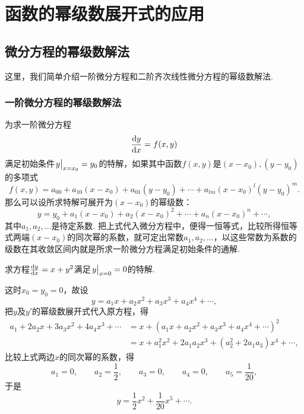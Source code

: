 \section{函数的幂级数展开式的应用}
\subsection{微分方程的幂级数解法}
这里，我们简单介绍一阶微分方程和二阶齐次线性微分方程的幂级数解法.

\subsubsection{一阶微分方程的幂级数解法}
为求一阶微分方程\begin{equation*}
\dv{y}{x} = f(x,y)
\end{equation*}满足初始条件\(\eval{y}_{x=x_0} = y_0\)的特解，如果其中函数\(f(x,y)\)是\((x-x_0),(y-y_0)\)的多项式\begin{equation*}
f(x,y) = a_{00} + a_{10} (x-x_0) + a_{01} (y-y_0) + \dotsb + a_{lm} (x-x_0)^l (y-y_0)^m.
\end{equation*}那么可以设所求特解可展开为\((x-x_0)\)的幂级数：\begin{equation*}
y = y_0 + a_1 (x-x_0) + a_2 (x-x_0)^2 + \dotsb + a_n (x-x_0)^n + \dotsb,
\end{equation*}其中\(a_1,a_2,\dotsc\)是待定系数.
把上式代入微分方程中，便得一恒等式，比较所得恒等式两端\((x-x_0)\)的同次幂的系数，就可定出常数\(a_1,a_2,\dotsc\)，以这些常数为系数的级数在其收敛区间内就是所求一阶微分方程满足初始条件的通解.

\begin{example}
求方程\(\dv{y}{x} = x + y^2\)满足\(\eval{y}_{x=0}=0\)的特解.
\begin{solution}
这时\(x_0=y_0=0\)，故设\begin{equation*}
y = a_1 x + a_2 x^2 + a_3 x^3 + a_4 x^4 + \dotsb,
\end{equation*}把\(y\)及\(y'\)的幂级数展开式代入原方程，得\begin{align*}
a_1 + 2a_2 x + 3a_3 x^2 + 4a_4 x^3 + \dotsb
&= x + (a_1 x + a_2 x^2 + a_3 x^3 + a_4 x^4 + \dotsb)^2 \\
&= x + a_1^2 x^2 + 2a_1a_2 x^3 + (a_2^2 + 2a_1a_3) x^4 + \dotsb,
\end{align*}
比较上式两边\(x\)的同次幂的系数，得\begin{equation*}
a_1 = 0, \qquad
a_2 = \frac{1}{2}, \qquad
a_3 = 0, \qquad
a_4 = 0, \qquad
a_5 = \frac{1}{20},
\end{equation*}于是\begin{equation*}
y = \frac{1}{2} x^2 + \frac{1}{20} x^5 + \dotsb.
\end{equation*}
\end{solution}
\end{example}

